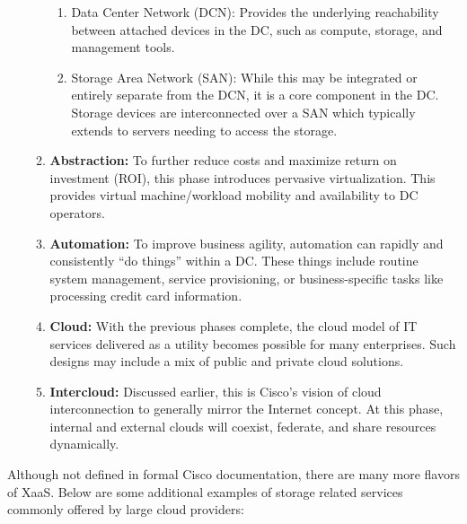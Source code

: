 \begin{enumerate}
\begin{enumerate}
	\begin{enumerate}
      \item Data Center Network (DCN): Provides the underlying reachability
	  between attached devices in the DC, such as compute, storage, and
	  management tools.
      \item Storage Area Network (SAN): While this may be integrated or
	  entirely separate from the DCN, it is a core component in the DC. Storage
	  devices are interconnected over a SAN which typically extends to servers
	  needing to access the storage.
	\end{enumerate}

    \item \textbf{Abstraction:} To further reduce costs and maximize return on
	investment (ROI), this phase introduces pervasive virtualization. This
	provides virtual machine/workload mobility and availability to DC operators.

    \item \textbf{Automation:} To improve business agility, automation can
	rapidly and consistently ``do things'' within a DC. These things include
	routine system management, service provisioning, or business-specific tasks
	like processing credit card information.
    \item \textbf{Cloud:} With the previous phases complete, the cloud model of IT
	services delivered as a utility becomes possible for many enterprises. Such
	designs may include a mix of public and private cloud solutions.
    \item \textbf{Intercloud:} Discussed earlier, this is Cisco's vision of
	cloud interconnection to generally mirror the Internet concept. At this
	phase, internal and external clouds will coexist, federate, and share
	resources dynamically.
  \end{enumerate}
\end{enumerate}

Although not defined in formal Cisco documentation, there are many more
flavors of XaaS. Below are some additional examples of storage related
services commonly offered by large cloud providers:

